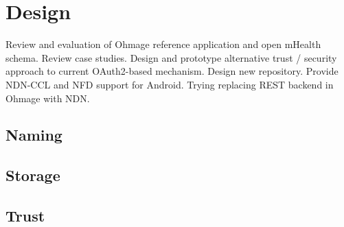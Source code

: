 \section{Design}

Review and evaluation of Ohmage reference application and open mHealth schema.
Review case studies. 
Design and prototype alternative trust / security approach to current OAuth2-based mechanism. 
Design new repository. 
Provide NDN-CCL and NFD support for Android. 
Trying replacing REST backend in Ohmage with NDN.

\subsection{Naming}
\subsection{Storage}
\subsection{Trust}


